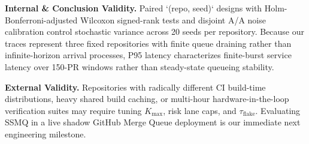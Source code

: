 \textbf{Internal \& Conclusion Validity.} Paired `(repo, seed)` designs with Holm-Bonferroni-adjusted Wilcoxon signed-rank tests and disjoint A/A noise calibration control stochastic variance across 20 seeds per repository. Because our traces represent three fixed repositories with finite queue draining rather than infinite-horizon arrival processes, P95 latency characterizes finite-burst service latency over 150-PR windows rather than steady-state queueing stability.

\textbf{External Validity.} Repositories with radically different CI build-time distributions, heavy shared build caching, or multi-hour hardware-in-the-loop verification suites may require tuning $K_{\max}$, risk lane caps, and $\tau_{\text{flake}}$. Evaluating SSMQ in a live shadow GitHub Merge Queue deployment is our immediate next engineering milestone.
